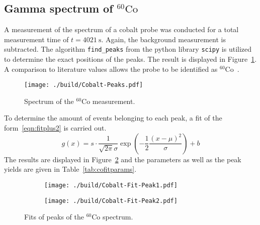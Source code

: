 \subsection{Gamma spectrum of \texorpdfstring{$^{60}\mathrm{Co}$}{cobalt}}
A measurement of the spectrum of a cobalt probe was conducted for a total measurement time of
$t=\SI{4021}{\second}$. Again, the background measurement is subtracted. The algorithm \texttt{find\_peaks}
from the python library \texttt{scipy} \cite{scipy}
is utilized to determine the exact positions of the peaks. The result is displayed in
Figure~\ref{fig:cospectrum}. A comparison to literature values allows the probe to be identified as
$^{60}\text{Co}$~\cite{laraweb}.
\begin{figure}
	\centering
	\begin{adjustbox}{width=1.4\textwidth, center}
		\texttt{[image: ./build/Cobalt-Peaks.pdf]}
	\end{adjustbox}
	\caption{Spectrum of the $^{60}\text{Co}$ measurement.}
	\label{fig:cospectrum}
\end{figure}
\noindent
To determine the amount of events belonging to each peak, a fit of the form~\ref{eqn:fitplus2} is carried out.
\begin{equation}
	g(x) = s \cdot \frac{1}{\sqrt{2 \pi} \sigma} \exp{\left( -\frac{1}{2} \frac{(x - \mu)^{2}}{\sigma} \right)} + b
	\label{eqn:fitplus2}
\end{equation}
\noindent
The results are displayed in Figure~\ref{fig:cofit} and the parameters as well as the peak yields are given in
Table~\ref{tab:cofitparams}.
\begin{figure}[H]
	\centering
	\begin{adjustbox}{width=1.3\textwidth, center}
		\begin{subfigure}{.5\textwidth}
			\centering
			\texttt{[image: ./build/Cobalt-Fit-Peak1.pdf]}
		\end{subfigure}%
		\begin{subfigure}{.5\textwidth}
			\centering
			\texttt{[image: ./build/Cobalt-Fit-Peak2.pdf]}
		\end{subfigure}
	\end{adjustbox}
	\caption{Fits of peaks of the $^{60}\text{Co}$ spectrum.}
	\label{fig:cofit}
\end{figure}
\noindent
